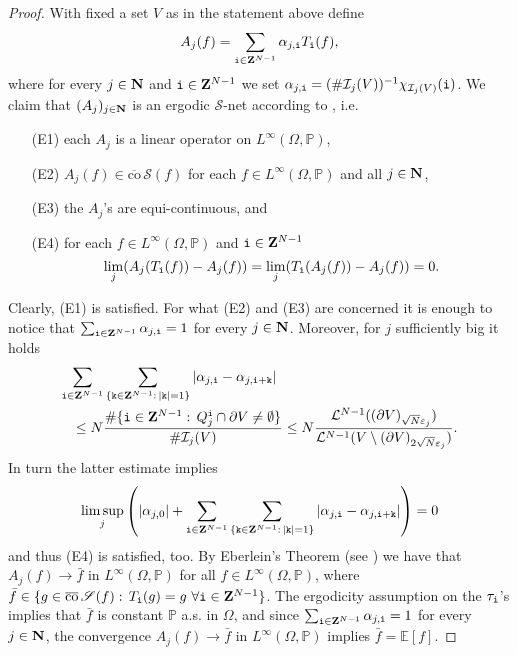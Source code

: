 \documentclass[10pt,reqno]{amsart}
\numberwithin{equation}{section}
\def\L{{\mathcal L}}
\def\N{{\bf N}}
\def\Z{{\bf Z}}
\def\eps{{\varepsilon}_j}
\def\ii{{\tt i}}
\def\kk{{\tt k}}
\def\Om{\Omega}
\def\Ieps{{\mathcal I}_j}
\def\mmu{\mathbb{P}}
\def\LN{\L^{N-1}}
\begin{document}
\begin{proof}
With fixed a set $V$ as in the statement above define
$$
A_{j}(f)=\sum_{\ii\in\Z^{N-1}}\alpha_{j,\ii}T_\ii(f),
$$
where for every $j\in\N$ and $\ii\in\Z^{N-1}$ we set
$\alpha_{j,\ii}=(\#\Ieps(V))^{-1}\chi_{\Ieps(V)}(\ii)$.
We claim that $(A_j)_{j\in\N}$ is an ergodic $\mathscr{S}$-net
according to \cite[p.75]{Kr}, i.e.
\begin{itemize}
\item[{(E1)}] each $A_j$ is a linear operator on $L^\infty(\Om,\mmu)$,

\item[{(E2)}] $A_j(f)\in\overline{\mathrm{co}}\,\mathscr{S}(f)$
for each $f\in L^\infty(\Om,\mmu)$ and all $j\in\N$,

\item[{(E3)}] the $A_j$'s are equi-continuous, and

\item[{(E4)}]  for each $f\in L^\infty(\Om,\mmu)$ and $\ii\in\Z^{N-1}$
$$
\lim_j(A_j(T_{\ii}(f))-A_j(f))=\lim_j(T_{\ii}(A_j(f))-A_j(f))=0.
$$
\end{itemize}
Clearly, (E1) is satisfied.
For what (E2) and (E3) are concerned it is enough to notice that
$\sum_{\ii\in\Z^{N-1}}\alpha_{j,\ii}=1$ for every $j\in\N$.
Moreover, for $j$ sufficiently big it holds
\begin{eqnarray*}
\lefteqn{\sum_{\ii\in\Z^{N-1}}\sum_{\{\kk\in\Z^{N-1}:\,|\kk|=1\}}
|\alpha_{j,\ii}-\alpha_{j,\ii+\kk}|}\\&&\leq N
\frac{\#\{\ii\in\Z^{N-1}:\,Q^{\ii}_j\cap\partial V\neq\emptyset\}}{\#\Ieps(V)}
\leq N\frac{\LN((\partial V)_{\sqrt{N}\eps})}
{\LN(V\setminus(\partial V)_{2\sqrt{N}\eps})}.
\end{eqnarray*}
In turn the latter estimate implies
$$
\limsup_j\left(|\alpha_{j,0}|+\sum_{\ii\in\Z^{N-1}}\sum_{\{\kk\in\Z^{N-1}:\,|\kk|=1\}}
|\alpha_{j,\ii}-\alpha_{j,\ii+\kk}|
\right)=0
$$
and thus (E4) is satisfied, too.
By Eberlein's Theorem (see \cite[Theorem 1.5 p.76]{Kr}) we have that
$A_j(f)\to \bar{f}$ in $L^\infty(\Om,\mmu)$ for all $f\in L^\infty(\Om,\mmu)$,
where $\bar{f}\in\{g\in\overline{\mathrm{co}}\,\mathscr{S}(f):\,
T_{\ii}(g)=g\,\, \forall \ii\in\Z^{N-1}\}$.
The ergodicity assumption on the $\tau_{\ii}$'s implies that
$\bar{f}$ is constant  $\mmu$ a.s. in $\Om$, and since
$\sum_{\ii\in\Z^{N-1}}\alpha_{j,\ii}=1$ for every $j\in\N$,
the convergence $A_j(f)\to\bar{f}$ in $L^\infty(\Om,\mmu)$
implies $\bar{f}=\mathbb E[f]$.


\end{proof}
\end{document}
